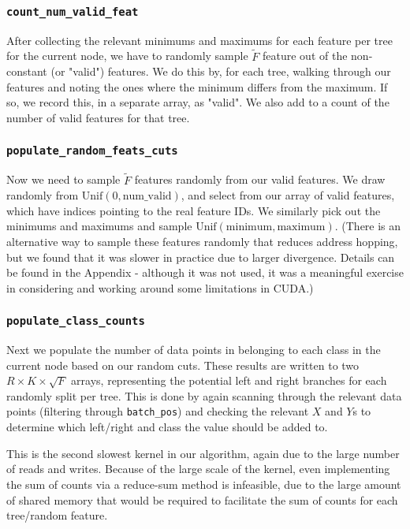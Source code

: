 \documentclass[10pt,conference]{IEEEtran}
\begin{document}
  \subsubsection{\texttt{count\_num\_valid\_feat}}
    After collecting the relevant minimums and maximums for each feature per tree for the current node, we have to randomly sample $\tilde{F}$ feature out of the non-constant (or "valid") features. We do this by, for each tree, walking through our features and noting the ones where the minimum differs from the maximum. If so, we record this, in a separate array, as "valid". We also add to a count of the number of valid features for that tree.
 
  \subsubsection{\texttt{populate\_random\_feats\_cuts}}
    Now we need to sample $\tilde{F}$ features randomly from our valid features. We draw randomly from $\text{Unif}(0, \text{num\_valid})$, and select from our array of valid features, which have indices pointing to the real feature IDs. We similarly pick out the minimums and maximums and sample $\text{Unif}(\text{minimum}, \text{maximum})$. (There is an alternative way to sample these features randomly that reduces address hopping, but we found that it was slower in practice due to larger divergence. Details can be found in the Appendix - although it was not used, it was a meaningful exercise in considering and working around some limitations in CUDA.)

  \subsubsection{\texttt{populate\_class\_counts}}
    Next we populate the number of data points in belonging to each class in the current node based on our random cuts. These results are written to two $R \times K \times \sqrt{F}$ arrays, representing the potential left and right branches for each randomly split per tree. This is done by again scanning through the relevant data points (filtering through \texttt{batch\_pos}) and checking the relevant $X$ and $Y$s to determine which left/right and class the value should be added to. 
    
    This is the second slowest kernel in our algorithm, again due to the large number of reads and writes. Because of the large scale of the kernel, even implementing the sum of counts via a reduce-sum method is infeasible, due to the large amount of shared memory that would be required to facilitate the sum of counts for each tree/random feature.
\end{document}
